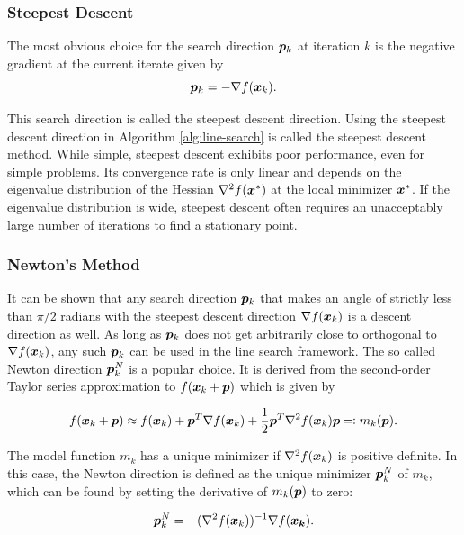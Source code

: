 \subsubsection{Steepest Descent}\label{sss:steepest-descent}
The most obvious choice for the search direction $\bm{p}_k$ at iteration $k$ is the negative gradient at the current iterate given by 
\[
    \bm{p}_k = -\nabla f(\bm{x}_k).
\]

\noindent This search direction is called the steepest descent direction. Using the steepest descent direction in Algorithm \ref{alg:line-search} 
is called the steepest descent method. While simple, steepest descent exhibits poor performance, even for simple problems. 
Its convergence rate is only linear and depends on the eigenvalue distribution of the Hessian $\nabla^2 f(\bm{x}^*)$ at the local minimizer
$\bm{x}^*$. If the eigenvalue distribution is wide, steepest descent often requires an unacceptably large number of iterations to find a 
stationary point.

\subsubsection{Newton's Method}\label{sss:newton-method}
It can be shown that any search direction $\bm{p}_k$ that makes an angle of strictly less than $\pi/2$ radians with the steepest descent
direction $\nabla f(\bm{x}_k)$ is a descent direction as well. As long as $\bm{p}_k$ does not get arbitrarily close to 
orthogonal to $\nabla f(\bm{x}_k)$, any such $\bm{p}_k$ can be used in the line search framework. The so called Newton direction $\bm{p}^N_k$ 
is a popular choice. It is derived from the second-order Taylor series approximation to $f(\bm{x}_k + \bm{p})$ which is given by

\begin{equation}\label{eq:newton-model}
    f(\bm{x}_k + \bm{p}) \approx f(\bm{x}_k) + \bm{p}^T \nabla f(\bm{x}_k) + \frac{1}{2}\bm{p}^T \nabla^2 f(\bm{x}_k) \bm{p} \eqqcolon 
    m_k(\bm{p}).
\end{equation}

\noindent The model function $m_k$ has a unique minimizer if $\nabla^2 f(\bm{x}_k)$ is positive definite. In this case, the Newton direction 
is defined
as the unique minimizer $\bm{p}^N_k$ of $m_k$, which can be found by setting the derivative of $m_k(\bm{p})$ to zero:

\begin{equation}\label{eq:newton-diretion}
    \bm{p}^N_k = - (\nabla^2 f(\bm{x}_k))^{-1} \nabla f(\bm{x_k}).
\end{equation}

